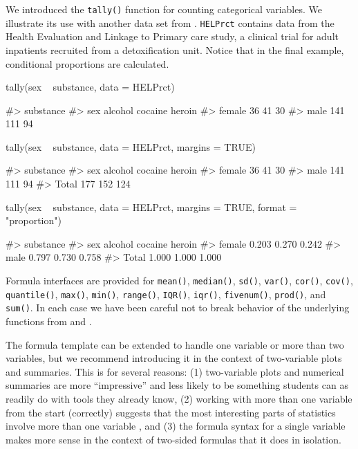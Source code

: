 \noindent
We introduced the \texttt{tally()} function for counting categorical
variables. We illustrate its use with another data set from
 \citep{mosaicData}. \texttt{HELPrct} contains data
from the Health Evaluation and Linkage to Primary care study, a clinical
trial for adult inpatients recruited from a detoxification unit. Notice
that in the final example, conditional proportions are calculated.

\begin{Schunk}
\begin{Sinput}
tally(sex ~ substance, data = HELPrct)
\end{Sinput}
\begin{Soutput}
#>         substance
#> sex      alcohol cocaine heroin
#>   female      36      41     30
#>   male       141     111     94
\end{Soutput}
\begin{Sinput}
tally(sex ~ substance, data = HELPrct, margins = TRUE)
\end{Sinput}
\begin{Soutput}
#>         substance
#> sex      alcohol cocaine heroin
#>   female      36      41     30
#>   male       141     111     94
#>   Total      177     152    124
\end{Soutput}
\begin{Sinput}
tally(sex ~ substance, data = HELPrct, margins = TRUE, format = "proportion")
\end{Sinput}
\begin{Soutput}
#>         substance
#> sex      alcohol cocaine heroin
#>   female   0.203   0.270  0.242
#>   male     0.797   0.730  0.758
#>   Total    1.000   1.000  1.000
\end{Soutput}
\end{Schunk}

Formula interfaces are provided for \texttt{mean()}, \texttt{median()},
\texttt{sd()}, \texttt{var()}, \texttt{cor()}, \texttt{cov()},
\texttt{quantile()}, \texttt{max()}, \texttt{min()}, \texttt{range()},
\texttt{IQR()}, \texttt{iqr()}, \texttt{fivenum()}, \texttt{prod()}, and
\texttt{sum()}. In each case we have been careful not to break behavior
of the underlying functions from  and .

The formula template can be extended to handle one variable or more than
two variables, but we recommend introducing it in the context of
two-variable plots and summaries. This is for several reasons: (1)
two-variable plots and numerical summaries are more ``impressive'' and
less likely to be something students can as readily do with tools they
already know, (2) working with more than one variable from the start
(correctly) suggests that the most interesting parts of statistics
involve more than one variable \citep{Wild:RSS:2011}, and (3) the
formula syntax for a single variable makes more sense in the context of
two-sided formulas that it does in isolation.

